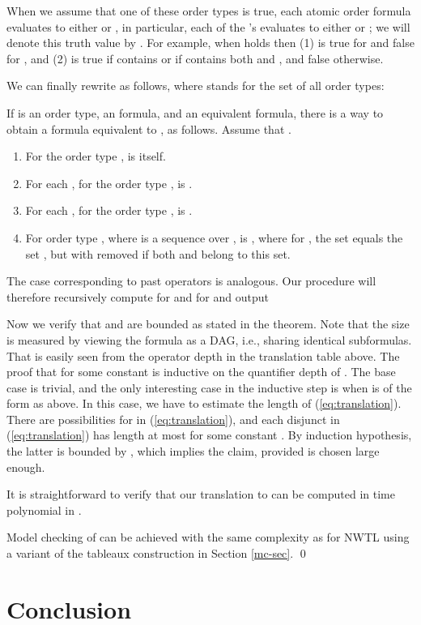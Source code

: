 \documentclass{LMCS}
\theoremstyle{plain}
\theoremstyle{definition}
\newcounter{example}
\begin{document}
When we assume that one of these order types is true,
each atomic order formula evaluates to either  or , in
particular, each of the 's evaluates to either  or
; we will denote this truth value by . 
For example, when  holds then
(1)  is true for  and false for , and
(2)  is true if  contains  or if  contains both  and ,
and false otherwise.

We can
finally rewrite  as follows, where  stands for the
set of all order types:

If  is an order type,  an
 formula, and  an equivalent  formula, there is
a way to obtain a  formula 
equivalent to , as follows.
Assume that .
\begin{enumerate}[]
\item
For the order type ,  is  itself.
\item For each ,  
for the order type ,  is .
\item For each ,  
for the order type ,  is .
\item 
For order type , where   is a sequence over , 
 is 
 ,
where for , the set  equals the set ,
but with  removed if both  and  belong to this set.
\end{enumerate}
The case corresponding to past operators is analogous.
Our procedure will therefore recursively compute  for 
and  for  and output



Now we verify that  and  are bounded as stated
in the theorem. 
Note that the size  is measured by viewing the 
formula as a DAG, i.e., sharing identical subformulas.
That  is easily
seen from the operator depth in the translation table above. 
The proof that  for
some constant  is inductive on the quantifier depth of . The
base case is trivial, and the only interesting case in the inductive
step is when  is of the form  as above.
In this case, we have to estimate the length of (\ref{eq:translation}).
There are  possibilities for 
in (\ref{eq:translation}), and each disjunct in (\ref{eq:translation}) has
length at most 
for some constant . By induction hypothesis, the latter is bounded
by , which implies the claim,
provided  is chosen large enough.

It is straightforward to verify that our translation to  can
be computed in time polynomial in .

Model checking of  can be achieved with the same complexity
as for NWTL using a variant of the tableaux construction in Section
\ref{mc-sec}.
\qed

\section{Conclusion}
\end{document}
